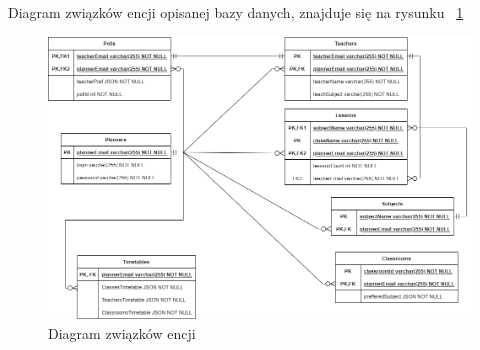 Diagram związków encji opisanej bazy danych, znajduje się na rysunku ~\ref{rys:sqldiag}

\begin{figure}[H]
	\centering\includegraphics[width=\textwidth]{figures/SQLdiag}
	\caption{Diagram związków encji}\label{rys:sqldiag}
\end{figure}